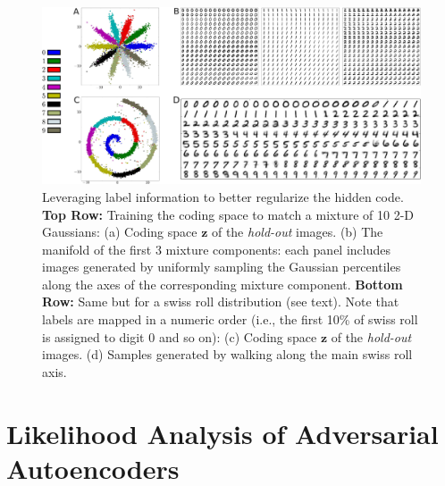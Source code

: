 \documentclass{article}
\begin{document}
\begin{figure}[t]
\centering\includegraphics[scale=.1]{semi}
\caption{\label{fig_semi_regularization}Leveraging label information to better regularize the hidden code. \textbf{Top Row:} Training the coding space to match a mixture of 10 2-D Gaussians: (a) Coding space $\mathbf{z}$ of the \emph{hold-out} images. (b) The manifold of the first 3 mixture components: each panel includes images generated by uniformly sampling the Gaussian percentiles along the axes of the corresponding mixture component. \textbf{Bottom Row:} Same but for a swiss roll distribution (see text). Note that labels are mapped in a numeric order (i.e., the first 10\% of swiss roll is assigned to digit $0$ and so on): (c) Coding space $\mathbf{z}$ of the \emph{hold-out} images. (d) Samples generated by walking along the main swiss roll axis.}
\end{figure}


\vspace{.2cm}
\section{Likelihood Analysis of Adversarial Autoencoders}\label{experiments}
\vspace{-.3cm}
\end{document}
